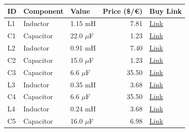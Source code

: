 \begin{table}[H]
    \centering
    \renewcommand{\arraystretch}{1.5}
    \begin{tabular}{@{}lllrl@{}}
        \toprule
        \textbf{ID} & \textbf{Component} & \textbf{Value} & \textbf{Price (\$/€)} & \textbf{Buy Link} \\
        \midrule
        L1 & Inductor & 1.15 mH & 7.81 & \href{https://www.soundimports.eu/en/jantzen-audio-000-1136.html}{Link} \\
        C1 & Capacitor & 22.0 $\mu$F & 1.23 & \href{https://www.soundimports.eu/en/it-intertechnik-elcr-22-100.html}{Link} \\
        L2 & Inductor & 0.91 mH & 7.40 & \href{https://www.soundimports.eu/en/jantzen-audio-000-5202.html}{Link} \\
        C2 & Capacitor & 15.0 $\mu$F & 1.23 & \href{https://www.soundimports.eu/en/jantzen-audio-001-6141.html}{Link} \\
        C3 & Capacitor & 6.6 $\mu$F & 35.50 & \href{https://www.soundimports.eu/en/claritycap-pur6u6h250vdc.html}{Link} \\
        L3 & Inductor & 0.35 mH & 3.68 & \href{https://www.soundimports.eu/en/dayton-audio-ac20-35.html}{Link} \\
        C4 & Capacitor & 6.6 $\mu$F & 35.50 & \href{https://www.soundimports.eu/en/claritycap-pur6u6h250vdc.html}{Link} \\
        L4 & Inductor & 0.24 mH & 3.68 & \href{https://www.soundimports.eu/en/jantzen-audio-000-1102.html}{Link} \\
        C5 & Capacitor & 16.0 $\mu$F & 6.98 & \href{https://www.soundimports.eu/en/jantzen-audio-001-0269.html}{Link} \\
        \bottomrule
    \end{tabular}
\end{table}
